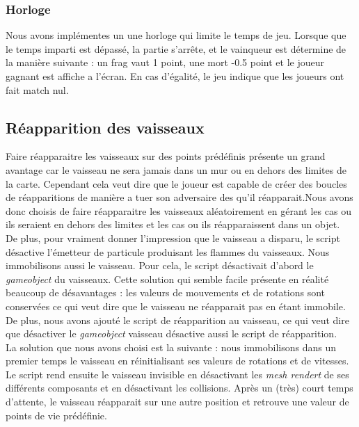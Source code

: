 \documentclass[10pt, titlepage]{report}
\begin{document}
\subsubsection{Horloge}
Nous avons implémentes un une horloge qui limite le temps de jeu. Lorsque que le temps imparti est dépassé, la partie s'arrête, et le vainqueur est détermine de la manière suivante : un frag vaut 1 point, une mort -0.5 point et le joueur gagnant est affiche a l'écran. En cas d'égalité, le jeu indique que les joueurs ont fait match nul.\\

\subsection{Réapparition des vaisseaux}  
Faire réapparaitre les vaisseaux sur des points prédéfinis présente un grand avantage car le vaisseau ne sera jamais dans un mur ou en dehors des limites de la carte. Cependant cela veut dire que le joueur est capable de créer des boucles de réapparitions de manière a tuer son adversaire des qu'il réapparait.Nous avons donc choisis de faire réapparaitre les vaisseaux aléatoirement en gérant les cas ou ils seraient en dehors des limites et les cas ou ils réapparaissent dans un objet.\\

De plus, pour vraiment donner l'impression que le vaisseau a disparu, le script désactive l'émetteur de particule produisant les flammes du vaisseaux. Nous immobilisons aussi le vaisseau. Pour cela, le script désactivait d'abord le \textit{gameobject} du vaisseaux. Cette solution qui semble facile présente en réalité beaucoup de désavantages : les valeurs de mouvements et de rotations sont conservées ce qui veut dire que le vaisseau ne réapparait pas en étant immobile. De plus, nous avons ajouté le script de réapparition au vaisseau, ce qui veut dire que désactiver le \textit{gameobject} vaisseau désactive aussi le script de réapparition.\\

 La solution que nous avons choisi est la suivante : nous immobilisons dans un premier temps le vaisseau en réinitialisant ses valeurs de rotations et de vitesses. Le script  rend ensuite le vaisseau invisible en désactivant les \textit{mesh rendert} de ses différents composants et en désactivant les collisions. Après un (très) court temps d'attente, le vaisseau réapparait sur une autre position et retrouve une valeur de points de vie prédéfinie.\\
\end{document}
